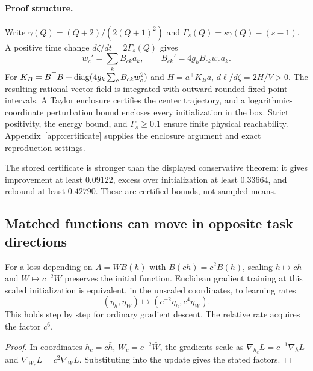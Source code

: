 \paragraph{Proof structure.}
Write $\gamma(Q)=(Q+2)/(2(Q+1)^2)$ and $\Gamma_s(Q)=s\gamma(Q)-(s-1)$. A positive time change $d\zeta/dt=2\Gamma_s(Q)$ gives
\begin{equation}
w_c'=\sum_k B_{ck}a_k,\qquad
B_{ck}'=4g_kB_{ck}w_ca_k.
\label{eq:zeta}
\end{equation}
For $K_B=B^\top B+\operatorname{diag}(4g_k\sum_c B_{ck}w_c^2)$ and $H=a^\top K_Ba$, $d\ell/d\zeta=2H/V>0$. The resulting rational vector field is integrated with outward-rounded fixed-point intervals. A Taylor enclosure certifies the center trajectory, and a logarithmic-coordinate perturbation bound encloses every initialization in the box. Strict positivity, the energy bound, and $\Gamma_s\geq0.1$ ensure finite physical reachability. Appendix~\ref{app:certificate} supplies the enclosure argument and exact reproduction settings.

The stored certificate is stronger than the displayed conservative theorem: it gives improvement at least $0.09122$, excess over initialization at least $0.33664$, and rebound at least $0.42790$. These are certified bounds, not sampled means.

\subsection{Matched functions can move in opposite task directions}
\begin{proposition}
\label{prop:scale}
For a loss depending on $A=WB(h)$ with $B(ch)=c^2B(h)$, scaling $h\mapsto ch$ and $W\mapsto c^{-2}W$ preserves the initial function. Euclidean gradient training at this scaled initialization is equivalent, in the unscaled coordinates, to learning rates
\begin{equation}
(\eta_h,\eta_W)\mapsto(c^{-2}\eta_h,c^4\eta_W).
\end{equation}
This holds step by step for ordinary gradient descent. The relative rate acquires the factor $c^6$.
\end{proposition}
\begin{proof}
In coordinates $h_c=c\bar h$, $W_c=c^{-2}\bar W$, the gradients scale as $\nabla_{h_c}L=c^{-1}\nabla_{\bar h}L$ and $\nabla_{W_c}L=c^2\nabla_{\bar W}L$. Substituting into the update gives the stated factors.
\end{proof}

